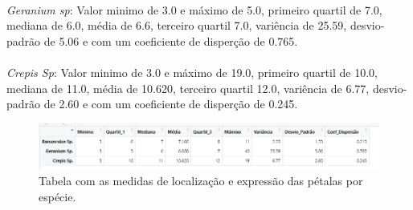 \documentclass{article}
\begin{document}
\paragraph{} \textit{Geranium sp}: Valor minimo de 3.0 e máximo de 5.0, primeiro quartil de 7.0, mediana de 6.0, média de 6.6,  terceiro quartil 7.0, variência de 25.59, desvio-padrão de 5.06 e com um coeficiente de disperção de 0.765.

\paragraph{} \textit{Crepis Sp}: Valor minimo de 3.0 e máximo de 19.0, primeiro quartil de 10.0, mediana de 11.0, média de 10.620,  terceiro quartil 12.0, variência de 6.77, desvio-padrão de 2.60 e com um coeficiente de disperção de 0.245.

\begin{figure}[h]
       \centering 
        \includegraphics[scale=0.8]{tabela_comprimento_especie.png}
       \caption{Tabela com as medidas de localização e expressão das pétalas por espécie.}
       \label{fig:logo}
    \end{figure}


\paragraph{}
\paragraph{}
\paragraph{}
\paragraph{}
\paragraph{}
\paragraph{}
\paragraph{}
\end{document}
